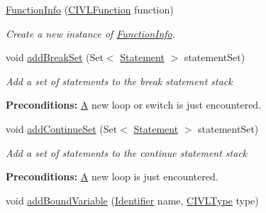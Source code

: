\begin{DoxyCompactItemize}
\item 
\hyperlink{classedu_1_1udel_1_1cis_1_1vsl_1_1civl_1_1model_1_1common_1_1FunctionInfo_a351632b7601e7545c51df87c51386f56}{Function\+Info} (\hyperlink{interfaceedu_1_1udel_1_1cis_1_1vsl_1_1civl_1_1model_1_1IF_1_1CIVLFunction}{C\+I\+V\+L\+Function} function)
\begin{DoxyCompactList}\small\item\em Create a new instance of \hyperlink{classedu_1_1udel_1_1cis_1_1vsl_1_1civl_1_1model_1_1common_1_1FunctionInfo}{Function\+Info}. \end{DoxyCompactList}\item 
void \hyperlink{classedu_1_1udel_1_1cis_1_1vsl_1_1civl_1_1model_1_1common_1_1FunctionInfo_ad095fe5f64e87d13c5687785a9af60e8}{add\+Break\+Set} (Set$<$ \hyperlink{interfaceedu_1_1udel_1_1cis_1_1vsl_1_1civl_1_1model_1_1IF_1_1statement_1_1Statement}{Statement} $>$ statement\+Set)
\begin{DoxyCompactList}\small\item\em Add a set of statements to the break statement stack 

{\bfseries Preconditions\+:}  \hyperlink{structA}{A} new loop or switch is just encountered. \end{DoxyCompactList}\item 
void \hyperlink{classedu_1_1udel_1_1cis_1_1vsl_1_1civl_1_1model_1_1common_1_1FunctionInfo_ae2d689b95f6f095a8d47f13a5f7721dc}{add\+Continue\+Set} (Set$<$ \hyperlink{interfaceedu_1_1udel_1_1cis_1_1vsl_1_1civl_1_1model_1_1IF_1_1statement_1_1Statement}{Statement} $>$ statement\+Set)
\begin{DoxyCompactList}\small\item\em Add a set of statements to the continue statement stack 

{\bfseries Preconditions\+:}  \hyperlink{structA}{A} new loop is just encountered. \end{DoxyCompactList}\item 
\hypertarget{classedu_1_1udel_1_1cis_1_1vsl_1_1civl_1_1model_1_1common_1_1FunctionInfo_a98610ddcf627cbdeed06b374122b0ebc}{}void \hyperlink{classedu_1_1udel_1_1cis_1_1vsl_1_1civl_1_1model_1_1common_1_1FunctionInfo_a98610ddcf627cbdeed06b374122b0ebc}{add\+Bound\+Variable} (\hyperlink{interfaceedu_1_1udel_1_1cis_1_1vsl_1_1civl_1_1model_1_1IF_1_1Identifier}{Identifier} name, \hyperlink{interfaceedu_1_1udel_1_1cis_1_1vsl_1_1civl_1_1model_1_1IF_1_1type_1_1CIVLType}{C\+I\+V\+L\+Type} type)\label{classedu_1_1udel_1_1cis_1_1vsl_1_1civl_1_1model_1_1common_1_1FunctionInfo_a98610ddcf627cbdeed06b374122b0ebc}


\end{DoxyCompactItemize}
